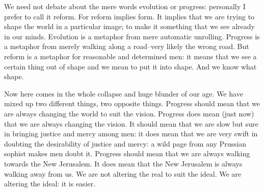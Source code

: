\documentclass{book}
\begin{document}
We need not debate about the mere words evolution or progress: personally I prefer to call it reform. For reform implies form. It implies that we are trying to shape the world in a particular image; to make it something that we see already in our minds. Evolution is a metaphor from mere automatic unrolling. Progress is a metaphor from merely walking along a road–very likely the wrong road. But reform is a metaphor for reasonable and determined men: it means that we see a certain thing out of shape and we mean to put it into shape. And we know what shape.

Now here comes in the whole collapse and huge blunder of our age. We have mixed up two different things, two opposite things. Progress should mean that we are always changing the world to suit the vision. Progress does mean (just now) that we are always changing the vision. It should mean that we are slow but sure in bringing justice and mercy among men: it does mean that we are very swift in doubting the desirability of justice and mercy: a wild page from any Prussian sophist makes men doubt it. Progress should mean that we are always walking towards the New Jerusalem. It does mean that the New Jerusalem is always walking away from us. We are not altering the real to suit the ideal. We are altering the ideal: it is easier.
\end{document}
